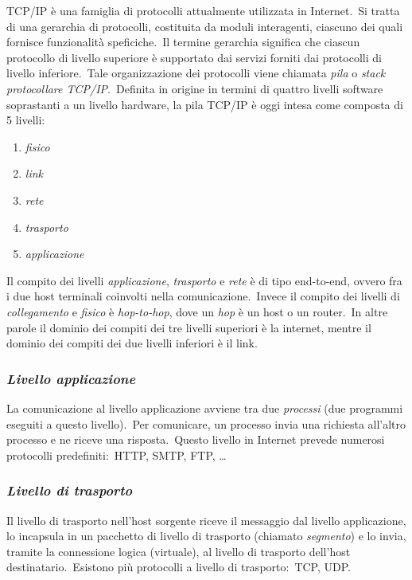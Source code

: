 TCP/IP è una famiglia di protocolli attualmente utilizzata in Internet.\
Si tratta di una gerarchia di protocolli, costituita da moduli interagenti, ciascuno dei quali fornisce funzionalità speficiche.\
Il termine gerarchia significa che ciascun protocollo di livello superiore è supportato dai servizi forniti dai protocolli di livello inferiore.\
Tale organizzazione dei protocolli viene chiamata \emph{pila} o \emph{stack protocollare TCP/IP}.\
Definita in origine in termini di quattro livelli software soprastanti a un livello hardware, la pila TCP/IP è oggi intesa come composta di 5 livelli:\
\begin{enumerate}
    \item \emph{fisico}
    \item \emph{link}
    \item \emph{rete}
    \item \emph{trasporto}
    \item \emph{applicazione}
\end{enumerate}
Il compito dei livelli \emph{applicazione}, \emph{trasporto} e \emph{rete} è di tipo end-to-end, ovvero fra i due host terminali coinvolti nella comunicazione.\
Invece il compito dei livelli di \emph{collegamento} e \emph{fisico} è \emph{hop-to-hop}, dove un \emph{hop} è un host o un router.\
In altre parole il dominio dei compiti dei tre livelli superiori è la internet, mentre il dominio dei compiti dei due livelli inferiori è il link.

\subsubsection{\emph{Livello applicazione}}

La comunicazione al livello applicazione avviene tra due \emph{processi} (due programmi eseguiti a questo livello).\
Per comunicare, un processo invia una richiesta all'altro processo e ne riceve una risposta.\
Questo livello in Internet prevede numerosi protocolli predefiniti:\ HTTP, SMTP, FTP, \dots

\subsubsection{\emph{Livello di trasporto}}

Il livello di trasporto nell'host sorgente riceve il messaggio dal livello applicazione, lo incapsula in un pacchetto di livello di trasporto (chiamato \emph{segmento}) e lo invia, tramite la connessione logica (virtuale), al livello di trasporto dell'host destinatario.\
Esistono più protocolli a livello di trasporto:\ TCP, UDP.


